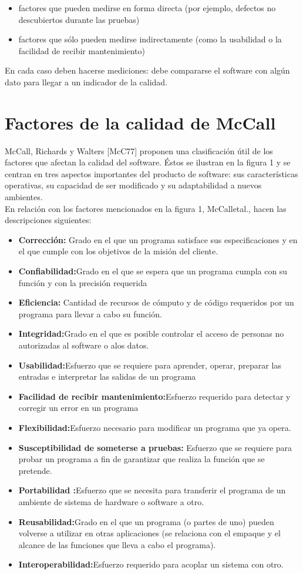 \begin{itemize}
\item factores que pueden medirse en forma directa (por ejemplo, defectos no descubiertos durante las pruebas)
\item factores que sólo pueden medirse indirectamente (como la usabilidad o la facilidad de recibir mantenimiento)
\end{itemize}
En cada caso deben hacerse mediciones: debe compararse el software con algún dato para llegar a un indicador de la calidad.
\section{Factores de la calidad de McCall}
McCall, Richards y Walters [McC77] proponen una clasificación útil de los factores que afectan la calidad del software. Éstos se ilustran en la figura 1 y se centran en tres aspectos importantes del producto de software: sus características operativas, su capacidad de ser modificado y su adaptabilidad a nuevos ambientes.\\
En relación con los factores mencionados en la figura 1, McCalletal., hacen las descripciones siguientes:\\
\begin{itemize}
    \item  \textbf{Corrección:} Grado en el que un programa satisface sus especificaciones y en el que cumple con los objetivos de la misión del cliente.
    \item  \textbf{Confiabilidad:}Grado en el que se espera que un programa cumpla con su función y con la precisión requerida 
    \item  \textbf{Eficiencia:} Cantidad de recursos de cómputo y de código requeridos por un programa para llevar a cabo su función.
    \item  \textbf{Integridad:}Grado en el que es posible controlar el acceso de personas no autorizadas al software o alos datos.
    \item  \textbf{Usabilidad:}Esfuerzo que se requiere para aprender, operar, preparar las entradas e interpretar las salidas de un programa
    \item  \textbf{Facilidad de recibir mantenimiento:}Esfuerzo requerido para detectar y corregir un error en un programa 
    \item  \textbf{Flexibilidad:}Esfuerzo necesario para modificar un programa que ya opera.
    \item  \textbf{Susceptibilidad de someterse a pruebas:} Esfuerzo que se requiere para probar un programa a fin de garantizar que realiza la función que se pretende. 
    \item  \textbf{Portabilidad :}Esfuerzo que se necesita para transferir el programa de un ambiente de sistema de hardware o software a otro.
    \item  \textbf{Reusabilidad:}Grado en el que un programa (o partes de uno) pueden volverse a utilizar en otras aplicaciones (se relaciona con el empaque y el alcance de las funciones que lleva a cabo el programa).
    \item  \textbf{Interoperabilidad:}Esfuerzo requerido para acoplar un sistema con otro.
\end{itemize}


